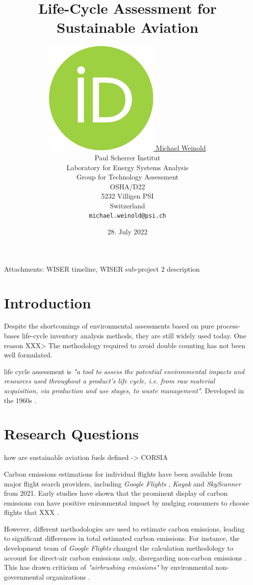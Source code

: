 \documentclass{article}
\title{Life-Cycle Assessment for Sustainable Aviation}
\author{
    \href{https://orcid.org/0000-0003-4859-2650}
    {\includegraphics[scale=0.06]{auxiliary/figures/orcid.pdf}
    \hspace{1mm}
    Michael Weinold} \\
	Paul Scherrer Institut\\
	Laboratory for Energy Systems Analysis\\
	Group for Technology Assessment\\
	OSHA/D22\\
    5232 Villigen PSI \\
    Switzerland \\
	\texttt{michael.weinold@psi.ch} \\
}
\date{28. July 2022}
\begin{document}


\maketitle

\begin{abstract}
	\cite{becattini_role_2021}
\end{abstract}

Attachments:
WISER timeline, WISER sub-project 2 description

\section{Introduction}

Despite the shortcomings of environmental assessments based on pure process-bases life-cycle inventory analysis methods, they are still widely used today. One reason XXX> The methodology required to avoid double counting has not been well formulated. 

    life cycle assessment is \textit{"a tool to assess the potential environmental impacts and resources used throughout a product’s life cycle, i.e. from raw material acquisition, via production and use stages, to waste management"}\cite{noauthor_iso_2006}. Developed in the 1960s \cite{hauschild_life_2018}. 
    
\section{Research Questions}
    
    how are sustainable aviation fuels defined -> CORSIA \cite{prussi_corsia_2021}

    Carbon emissions estimations for individual flights have been available from major flight search providers, including \textit{Google Flights} \cite{holden_google_2021}, \textit{Kayak} \cite{noauthor_kayak_2021} and \textit{SkyScanner} \cite{crosthwaite_how_2021} from 2021. Early studies have shown that the prominent display of carbon emissions can have positive enironmental impact by nudging consumers to choose flights that XXX \cite{amenta_adding_2020}\cite{sanguinetti_nudging_2022}.
    
    However, different methodologies are used to estimate carbon emissions, leading to significant differences in total estimated carbon emissions. For instance, the development team of \textit{Google Flights} changed the calculation methodology to account for direct-air carbon emissions only, disregarding non-carbon emissions \cite{ali_commit_2022}. This has drawn criticism of \textit{"airbrushing emissions"} by environmental non-governmental organizations \cite{hern_google_2022}\cite{rowlatt_google_2022}.
    
\end{document}
